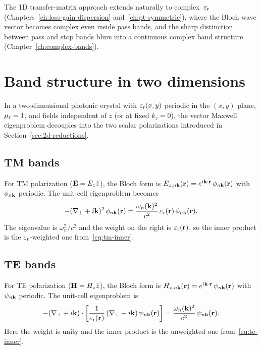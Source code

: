 The 1D transfer-matrix approach extends naturally to complex~$\varepsilon_{\mathrm{r}}$
(Chapters~\ref{ch:loss-gain-dispersion} and~\ref{ch:pt-symmetric}), where the Bloch
wave vector becomes complex even inside pass bands, and the sharp
distinction between pass and stop bands blurs into a continuous complex
band structure (Chapter~\ref{ch:complex-bands}).


\section{Band structure in two dimensions}
\label{sec:2d-bands}

In a two-dimensional photonic crystal with $\varepsilon_{\mathrm{r}}(x,y)$ periodic in the
$(x,y)$ plane, $\mu_{\mathrm{r}} = 1$, and fields independent of $z$ (or at fixed
$k_z = 0$), the vector Maxwell eigenproblem decouples into the two scalar
polarizations introduced in Section~\ref{sec:2d-reductions}.

\subsection{TM bands}
\label{ssec:tm-bands}

For TM polarization ($\mathbf{E} = E_z\hat{z}$), the Bloch form is
$E_{z,n\mathbf{k}}(\mathbf{r}) = e^{i\mathbf{k}\cdot\mathbf{r}}\,\phi_{n\mathbf{k}}(\mathbf{r})$ with
$\phi_{n\mathbf{k}}$ periodic. The unit-cell eigenproblem becomes
\begin{equation}
 -(\nabla_\perp + i\mathbf{k})^2\,\phi_{n\mathbf{k}}(\mathbf{r})
 = \frac{\omega_n(\mathbf{k})^2}{c^2}\,\varepsilon_{\mathrm{r}}(\mathbf{r})\,\phi_{n\mathbf{k}}(\mathbf{r}).
 \label{eq:tm-bloch}
\end{equation}
The eigenvalue is $\omega_n^2/c^2$ and the weight on the right is
$\varepsilon_{\mathrm{r}}(\mathbf{r})$, so the inner product is the $\varepsilon_{\mathrm{r}}$-weighted one
from~\eqref{eq:tm-inner}.

\subsection{TE bands}
\label{ssec:te-bands}

For TE polarization ($\mathbf{H} = H_z\hat{z}$), the Bloch form is
$H_{z,n\mathbf{k}}(\mathbf{r}) = e^{i\mathbf{k}\cdot\mathbf{r}}\,\psi_{n\mathbf{k}}(\mathbf{r})$ with
$\psi_{n\mathbf{k}}$ periodic. The unit-cell eigenproblem is
\begin{equation}
 -(\nabla_\perp + i\mathbf{k})\cdot
 \left[\frac{1}{\varepsilon_{\mathrm{r}}(\mathbf{r})}\,
 (\nabla_\perp + i\mathbf{k})\,\psi_{n\mathbf{k}}(\mathbf{r})\right]
 = \frac{\omega_n(\mathbf{k})^2}{c^2}\,\psi_{n\mathbf{k}}(\mathbf{r}).
 \label{eq:te-bloch}
\end{equation}
Here the weight is unity and the inner product is the unweighted one
from~\eqref{eq:te-inner}.

